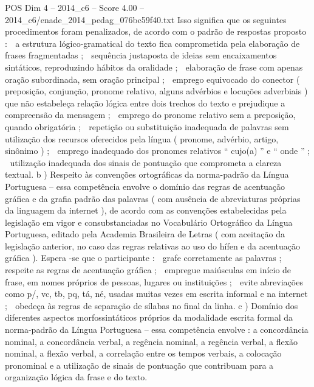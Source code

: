 \begin{textsample}{POS Dim 4 – 2014\_c6 – Score 4.00 – 2014\_c6/enade\_2014\_pedag\_076bc59f40.txt}
Isso significa que os seguintes procedimentos foram penalizados, de acordo com o padrão de respostas proposto :  a estrutura lógico-gramatical do texto fica comprometida pela elaboração de frases fragmentadas ;  sequência justaposta de ideias sem encaixamentos sintáticos, reproduzindo hábitos da oralidade ;  elaboração de frase com apenas oração subordinada, sem oração principal ;  emprego equivocado do conector ( preposição, conjunção, pronome relativo, alguns advérbios e locuções adverbiais ) que não estabeleça relação lógica entre dois trechos do texto e prejudique a compreensão da mensagem ;  emprego do pronome relativo sem a preposição, quando obrigatória ;  repetição ou substituição inadequada de palavras sem utilização dos recursos oferecidos pela língua ( pronome, advérbio, artigo, sinônimo ) ;  emprego inadequado dos pronomes relativos “ cujo(a) ” e “ onde ” ;  utilização inadequada dos sinais de pontuação que comprometa a clareza textual. b ) Respeito às convenções ortográficas da norma-padrão da Língua Portuguesa – essa competência envolve o domínio das regras de acentuação gráfica e da grafia padrão das palavras ( com ausência de abreviaturas próprias da linguagem da internet ), de acordo com as convenções estabelecidas pela legislação em vigor e consubstanciadas no Vocabulário Ortográfico da Língua Portuguesa, editado pela Academia Brasileira de Letras ( com aceitação da legislação anterior, no caso das regras relativas ao uso do hífen e da acentuação gráfica ).
Espera -se que o participante :  grafe corretamente as palavras ;  respeite as regras de acentuação gráfica ;  empregue maiúsculas em início de frase, em nomes próprios de pessoas, lugares ou instituições ;  evite abreviações como p/, vc, tb, pq, tá, né, usadas muitas vezes em escrita informal e na internet ;  obedeça às regras de separação de sílabas no final da linha. c ) Domínio dos diferentes aspectos morfossintáticos próprios da modalidade escrita formal da norma-padrão da Língua Portuguesa – essa competência envolve : a concordância nominal, a concordância verbal, a regência nominal, a regência verbal, a flexão nominal, a flexão verbal, a correlação entre os tempos verbais, a colocação pronominal e a utilização de sinais de pontuação que contribuam para a organização lógica da frase e do texto.

\end{textsample}
